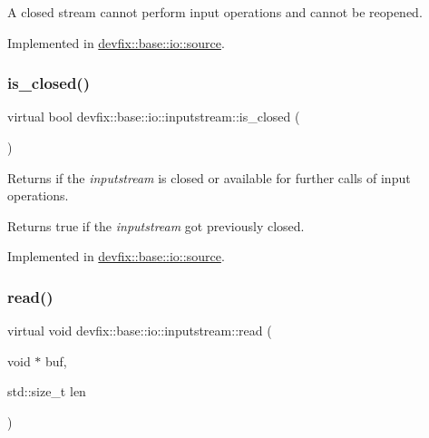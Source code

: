 A closed stream cannot perform input operations and cannot be reopened. 

Implemented in \hyperlink{structdevfix_1_1base_1_1io_1_1source_aa00a381c8a166cbbc5dbf6de4b56590e}{devfix\+::base\+::io\+::source}.

\mbox{\label{structdevfix_1_1base_1_1io_1_1inputstream_a9da6b400424ff476ed0479193c219fa9}} 
\subsubsection{\texorpdfstring{is\+\_\+closed()}{is\_closed()}}
{\footnotesize\ttfamily virtual bool devfix\+::base\+::io\+::inputstream\+::is\+\_\+closed (\begin{DoxyParamCaption}{ }\end{DoxyParamCaption})\hspace{0.3cm}{\ttfamily [pure virtual]}}



Returns if the {\itshape inputstream} is closed or available for further calls of input operations. 

\begin{DoxyReturn}{Returns}
true if the {\itshape inputstream} got previously closed. 
\end{DoxyReturn}


Implemented in \hyperlink{structdevfix_1_1base_1_1io_1_1source_a406834cf6651d48949b96d0ef49cc6c1}{devfix\+::base\+::io\+::source}.

\mbox{\label{structdevfix_1_1base_1_1io_1_1inputstream_a17e1a21881ae263650ebdaafaee2e71a}} 
\subsubsection{\texorpdfstring{read()}{read()}}
{\footnotesize\ttfamily virtual void devfix\+::base\+::io\+::inputstream\+::read (\begin{DoxyParamCaption}\item[{void $\ast$}]{buf,  }\item[{std\+::size\+\_\+t}]{len }\end{DoxyParamCaption})\hspace{0.3cm}{\ttfamily [pure virtual]}}



